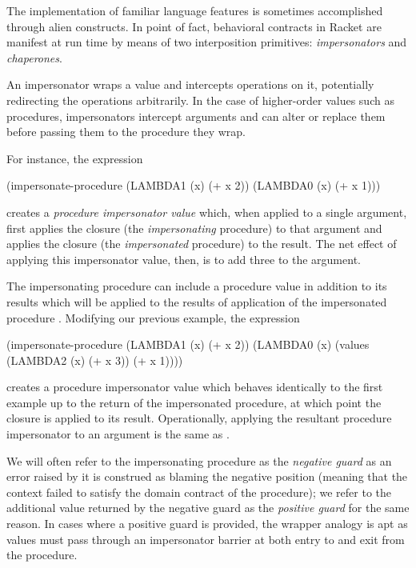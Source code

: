 \documentclass{sigplanconf}
\begin{document}
The implementation of familiar language features is sometimes accomplished through alien constructs.
In point of fact, behavioral contracts in Racket are manifest at run time by means of two interposition primitives: \emph{impersonators} and \emph{chaperones}.

An impersonator wraps a value and intercepts operations on it, potentially redirecting the operations arbitrarily.
In the case of higher-order values such as procedures, impersonators intercept arguments and can alter or replace them before passing them to the procedure they wrap.

For instance, the expression
\begin{schemedisplay}
(impersonate-procedure (LAMBDA1 (x) (+ x 2)) (LAMBDA0 (x) (+ x 1)))
\end{schemedisplay}
creates a \emph{procedure impersonator value} which, when applied to a single argument, first applies the  closure (the \emph{impersonating} procedure) to that argument and applies the  closure (the \emph{impersonated} procedure) to the result.
The net effect of applying this impersonator value, then, is to add three to the argument.

The impersonating procedure  can include a procedure value in addition to its results which will be applied to the results of application of the impersonated procedure .
Modifying our previous example, the expression
\begin{schemedisplay}
(impersonate-procedure (LAMBDA1 (x) (+ x 2))
                       (LAMBDA0 (x) (values (LAMBDA2 (x) (+ x 3)) (+ x 1))))
\end{schemedisplay}
creates a procedure impersonator value which behaves identically to the first example up to the return of the impersonated procedure, at which point the  closure is applied to its result.
Operationally, applying the resultant procedure impersonator to an argument  is the same as .

We will often refer to the impersonating procedure as the \emph{negative guard} as an error raised by it is construed as blaming the negative position (meaning that the context failed to satisfy the domain contract of the procedure); we refer to the additional value returned by the negative guard as the \emph{positive guard} for the same reason.
In cases where a positive guard is provided, the wrapper analogy is apt as values must pass through an impersonator barrier at both entry to and exit from the procedure.
\end{document}
